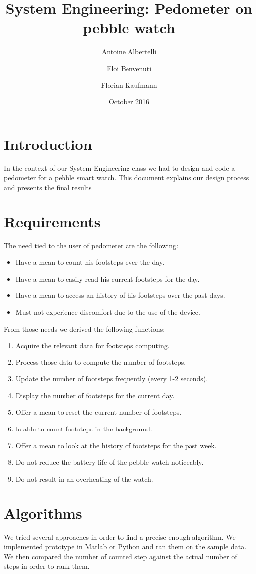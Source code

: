 \documentclass[12pt,twoside,a4paper]{article}
\title{System Engineering: Pedometer on pebble watch}
\author{Antoine Albertelli \and Eloi Benvenuti \and Florian Kaufmann}
\date{October 2016}
\begin{document}
\maketitle

\section{Introduction}
In the context of our System Engineering class we had to design and code a pedometer for a pebble smart	watch. This document explains our design process and presents the final results
\section{Requirements}
The need tied to the user of pedometer are the following:
\begin{itemize}
	\item Have a mean to count his footsteps over the day.
	\item Have a mean to easily read his current footsteps for the day.
	\item Have a mean to access an history of his footsteps over the past days.
	\item Must not experience discomfort due to the use of the device.
\end{itemize}

From those needs we derived the following functions:
\begin{enumerate}
	\item Acquire the relevant data for footsteps computing.
	\item Process those data to compute the number of footsteps.
	\item Update the number of footsteps frequently (every 1-2 seconds).
	\item Display the number of footsteps for the current day.
	\item Offer a mean to reset the current number of footsteps.
	\item Is able to count footsteps in the background.
	\item Offer a mean to look at the history of footsteps for the past week.
	\item Do not reduce the battery life of the pebble watch noticeably.
	\item Do not result in an overheating of the watch.
\end{enumerate}

\section{Algorithms}
We tried several approaches in order to find a precise enough algorithm.
We implemented prototype in Matlab or Python and ran them on the sample data.
We then compared the number of counted step against the actual number of steps in order to rank them.
\end{document}
